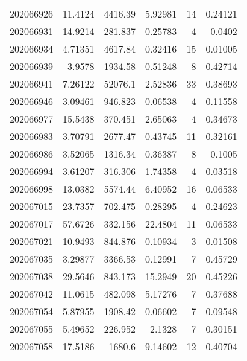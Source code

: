 \begin{tabular}{rrrrrr}
 202066926 &         11.4124  &     4416.39   &            5.92981 &          14 & 0.24121 \\
 202066931 &         14.9214  &      281.837  &            0.25783 &           4 & 0.0402  \\
 202066934 &          4.71351 &     4617.84   &            0.32416 &          15 & 0.01005 \\
 202066939 &          3.9578  &     1934.58   &            0.51248 &           8 & 0.42714 \\
 202066941 &          7.26122 &    52076.1    &            2.52836 &          33 & 0.38693 \\
 202066946 &          3.09461 &      946.823  &            0.06538 &           4 & 0.11558 \\
 202066977 &         15.5438  &      370.451  &            2.65063 &           4 & 0.34673 \\
 202066983 &          3.70791 &     2677.47   &            0.43745 &          11 & 0.32161 \\
 202066986 &          3.52065 &     1316.34   &            0.36387 &           8 & 0.1005  \\
 202066994 &          3.61207 &      316.306  &            1.74358 &           4 & 0.03518 \\
 202066998 &         13.0382  &     5574.44   &            6.40952 &          16 & 0.06533 \\
 202067015 &         23.7357  &      702.475  &            0.28295 &           4 & 0.24623 \\
 202067017 &         57.6726  &      332.156  &           22.4804  &          11 & 0.06533 \\
 202067021 &         10.9493  &      844.876  &            0.10934 &           3 & 0.01508 \\
 202067035 &          3.29877 &     3366.53   &            0.12991 &           7 & 0.45729 \\
 202067038 &         29.5646  &      843.173  &           15.2949  &          20 & 0.45226 \\
 202067042 &         11.0615  &      482.098  &            5.17276 &           7 & 0.37688 \\
 202067054 &          5.87955 &     1908.42   &            0.06602 &           7 & 0.09548 \\
 202067055 &          5.49652 &      226.952  &            2.1328  &           7 & 0.30151 \\
 202067058 &         17.5186  &     1680.6    &            9.14602 &          12 & 0.40704 \\

\end{tabular}
